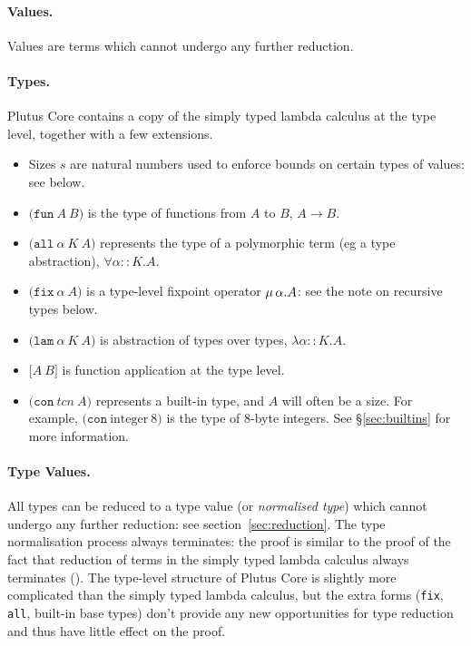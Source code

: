 \documentclass[a4paper]{article}
\newcommand{\keyword}[1]{\texttt{#1}}
\newcommand{\construct}[1]{\texttt{(} #1 \texttt{)}}
\newcommand{\funT}[2]{\construct{\keyword{fun} ~ #1 ~ #2}}
\newcommand{\fixT}[2]{\construct{\keyword{fix} ~ #1 ~ #2}}
\newcommand{\allT}[3]{\construct{\keyword{all} ~ #1 ~ #2 ~ #3}}
\newcommand{\conT}[2]{\construct{\keyword{con} ~ #1 ~ #2}}
\newcommand{\lamT}[3]{\construct{\keyword{lam} ~ #1 ~ #2 ~ #3}}
\newcommand{\appT}[2]{\texttt{[} #1 ~ #2 \texttt{]}}
\begin{document}



\paragraph{Values.} Values are terms which cannot undergo any further reduction.

\paragraph{Types.} Plutus Core contains a copy of the simply typed lambda calculus
  at the type level, together with a few extensions.
\begin{itemize}
\item Sizes $s$ are natural numbers used to enforce bounds on certain types of values: see below.
\item $\funT{A}{B}$ is the type of functions from $A$ to $B$, $A \rightarrow B$.
\item $\allT{\alpha}{K}{A}$ represents the type of a polymorphic term (eg a type abstraction), $\forall \alpha{::}K.A$.
\item $\fixT{\alpha}{A}$ is a type-level fixpoint operator $\mu\,\alpha.A$: see the note on recursive types below.
\item $\lamT{\alpha}{K}{A}$ is abstraction of types over types, $\lambda \alpha{::}K.A$.
\item $\appT{A}{B}$ is function application at the type level.
\item $\conT{tcn}{A}$ represents a built-in type, and $A$ will often be a size.  For example, $\conT{\textrm{integer}}{8}$
is the type of 8-byte integers.  See \S\ref{sec:builtins} for more information.
\end{itemize}

\paragraph{Type Values.} All types can be reduced to a type value (or
  \textit{normalised type}) which cannot undergo any further
  reduction: see section~\ref{sec:reduction}.  The type normalisation
  process always terminates: the proof is similar to the proof of the
  fact that reduction of terms in the simply typed lambda calculus
  always terminates (\cite[\S12]{Pierce:TAPL}).  The type-level
  structure of Plutus Core is slightly more complicated than the
  simply typed lambda calculus, but the extra forms (\texttt{fix},
  \texttt{all}, built-in base types) don't provide any new
  opportunities for type reduction and thus have little effect on the
  proof.
\end{document}

